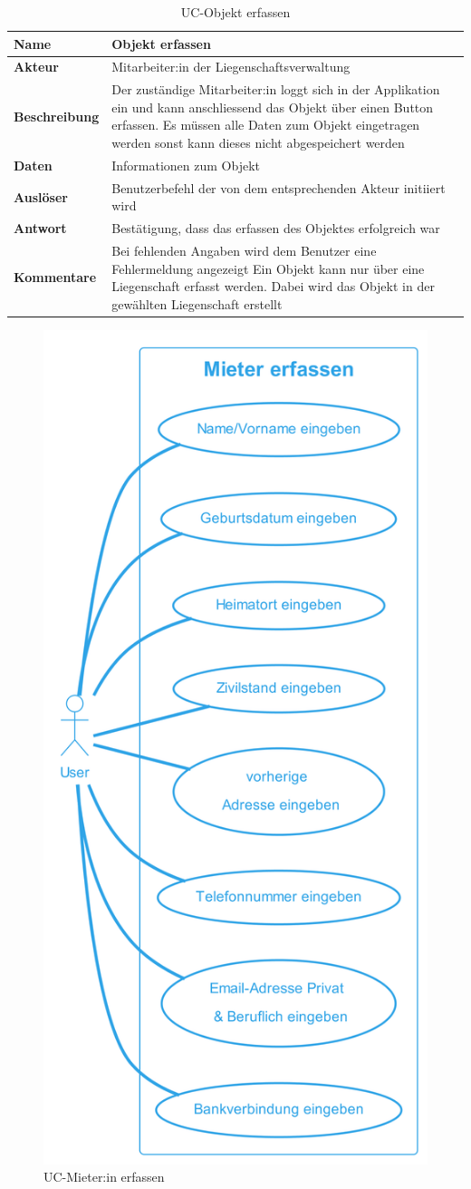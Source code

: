 \vspace*{-1cm}

\begin{table}[H]
  \centering
  \settowidth{}
  \setlength\extrarowheight{2pt}
  \begin{tabulary}{1.0\textwidth}{|a|m{14cm}|}
    \hline
    \textbf{Name}& Objekt erfassen\\
    \hline
    \textbf{Akteur}& Mitarbeiter:in der Liegenschaftsverwaltung\\
    \hline 
    \textbf{Beschreibung} & Der zuständige Mitarbeiter:in loggt sich in der Applikation ein und kann anschliessend das Objekt über einen Button erfassen. Es müssen alle Daten zum Objekt eingetragen werden sonst kann dieses nicht abgespeichert werden\\
    \hline
    \textbf{Daten} & Informationen zum Objekt\\
    \hline
    \textbf{Auslöser} & Benutzerbefehl der von dem entsprechenden Akteur initiiert wird\\
    \hline
    \textbf{Antwort} & Bestätigung, dass das erfassen des Objektes erfolgreich war\\
    \hline
    \textbf{Kommentare} & Bei fehlenden Angaben wird dem Benutzer eine Fehlermeldung angezeigt\newline 
    Ein Objekt kann nur über eine Liegenschaft erfasst werden. Dabei wird das Objekt in der gewählten Liegenschaft erstellt\\
    \hline
  \end{tabulary}
  \caption{UC-Objekt erfassen}
\end{table}

\begin{figure}[H]
  \begin{center}
    \includegraphics[width=0.4\linewidth]{content/diagrams/out/usecase/mieterErfassen/Mieter erfassen.png}
    \caption{UC-Mieter:in erfassen}
  \end{center}
\end{figure}

